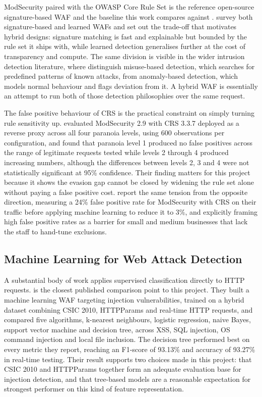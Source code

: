 \documentclass[runningheads]{llncs}
\begin{document}
ModSecurity paired with the OWASP Core Rule Set is the reference
open-source signature-based WAF and the baseline this work compares
against \citep{owaspcrs2024, owaspwaf2024}. \citet{applebaum2021}
survey both signature-based and learned WAFs and set out the trade-off
that motivates hybrid designs: signature matching is fast and
explainable but bounded by the rule set it ships with, while learned
detection generalises further at the cost of transparency and compute.
The same division is visible in the wider intrusion detection
literature, where \citet{garciateodoro2009} distinguish misuse-based
detection, which searches for predefined patterns of known attacks,
from anomaly-based detection, which models normal behaviour and flags
deviation from it. A hybrid WAF is essentially an attempt to run both
of those detection philosophies over the same request.

The false positive behaviour of CRS is the practical constraint on
simply turning rule sensitivity up. \citet{reyesnarvaez2025} evaluated
ModSecurity 2.9 with CRS 3.3.7 deployed as a reverse proxy across all
four paranoia levels, using 600 observations per configuration, and
found that paranoia level 1 produced no false positives across the
range of legitimate requests tested while levels 2 through 4 produced
increasing numbers, although the differences between levels 2, 3 and 4
were not statistically significant at 95\% confidence. Their finding
matters for this project because it shows the evasion gap cannot be
closed by widening the rule set alone without paying a false positive
cost. \citet{tran2020} report the same tension from the opposite
direction, measuring a 24\% false positive rate for ModSecurity with
CRS on their traffic before applying machine learning to reduce it to
3\%, and explicitly framing high false positive rates as a barrier for
small and medium businesses that lack the staff to hand-tune
exclusions.

\subsection{Machine Learning for Web Attack Detection}

A substantial body of work applies supervised classification directly
to HTTP requests. \citet{durmuskaya2025} is the closest published
comparison point to this project. They built a machine learning WAF
targeting injection vulnerabilities, trained on a hybrid dataset
combining CSIC 2010, HTTPParams and real-time HTTP requests, and
compared five algorithms, k-nearest neighbours, logistic regression,
naive Bayes, support vector machine and decision tree, across XSS, SQL
injection, OS command injection and local file inclusion. The decision
tree performed best on every metric they report, reaching an F1-score
of 93.13\% and accuracy of 93.27\% in real-time testing. Their result
supports two choices made in this project: that CSIC 2010 and
HTTPParams together form an adequate evaluation base for injection
detection, and that tree-based models are a reasonable expectation for
strongest performer on this kind of feature representation.
\end{document}
